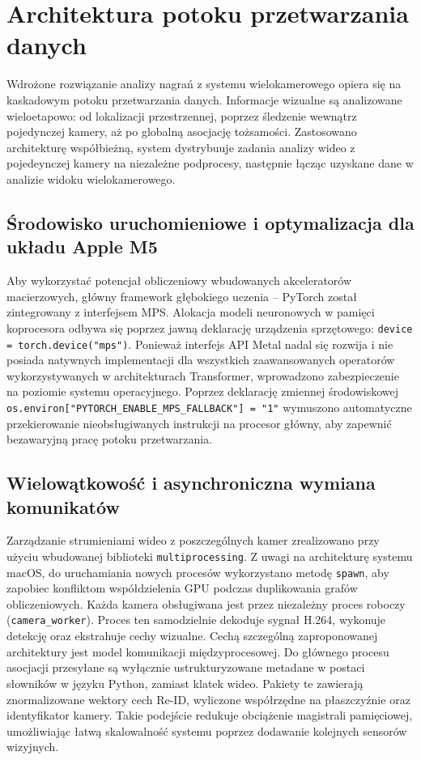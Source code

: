 \section{Architektura potoku przetwarzania danych}

Wdrożone rozwiązanie analizy nagrań z systemu wielokamerowego opiera się na kaskadowym potoku
przetwarzania danych. Informacje wizualne są analizowane wieloetapowo: od lokalizacji
przestrzennej, poprzez śledzenie wewnątrz pojedynczej kamery, aż po globalną asocjację tożsamości.
Zastosowano architekturę współbieżną, system dystrybuuje zadania analizy wideo z pojedeynczej
kamery na niezależne podprocesy, następnie łącząc uzyskane dane w analizie widoku wielokamerowego.

\subsection{Środowisko uruchomieniowe i optymalizacja dla układu Apple M5}

Aby wykorzystać potencjał obliczeniowy wbudowanych akceleratorów macierzowych, główny framework
głębokiego uczenia -- PyTorch został zintegrowany z interfejsem MPS. Alokacja modeli neuronowych w
pamięci koprocesora odbywa się poprzez jawną deklarację urządzenia sprzętowego: \texttt{device =
  torch.device("mps")}. Ponieważ interfejs API Metal nadal się rozwija i nie posiada natywnych
implementacji dla wszystkich zaawansowanych operatorów wykorzystywanych w architekturach
Transformer, wprowadzono zabezpieczenie na poziomie systemu operacyjnego. Poprzez deklarację
zmiennej środowiskowej \texttt{os.environ["PYTORCH\_ENABLE\_MPS\_FALLBACK"] = "1"} wymuszono
automatyczne przekierowanie nieobsługiwanych instrukcji na procesor główny, aby zapewnić
bezawaryjną pracę potoku przetwarzania.

\subsection{Wielowątkowość i asynchroniczna wymiana komunikatów}

Zarządzanie strumieniami wideo z poszczególnych kamer zrealizowano przy użyciu wbudowanej
biblioteki \texttt{multiprocessing}. Z uwagi na architekturę systemu macOS, do uruchamiania nowych
procesów wykorzystano metodę \texttt{spawn}, aby zapobiec konfliktom współdzielenia GPU podczas
duplikowania grafów obliczeniowych. Każda kamera obsługiwana jest przez niezależny proces roboczy
(\texttt{camera\_worker}). Proces ten samodzielnie dekoduje sygnał H.264, wykonuje detekcję oraz
ekstrahuje cechy wizualne. Cechą szczególną zaproponowanej architektury jest model komunikacji
międzyprocesowej. Do głównego procesu asocjacji przesyłane są wyłącznie ustrukturyzowane metadane w
postaci słowników w języku Python, zamiast klatek wideo. Pakiety te zawierają znormalizowane
wektory cech Re-ID, wyliczone współrzędne na płaszczyźnie oraz identyfikator kamery. Takie
podejście redukuje obciążenie magistrali pamięciowej, umożliwiając łatwą skalowalność systemu
poprzez dodawanie kolejnych sensorów wizyjnych.

